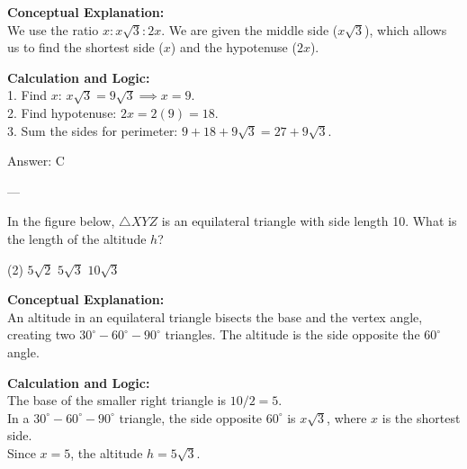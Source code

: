 \documentclass[11pt,paper=a4,answers]{exam}
\begin{document}
\begin{questions}
\begin{solution}
\textbf{Conceptual Explanation:} \\
We use the ratio $x : x\sqrt{3} : 2x$. We are given the middle side ($x\sqrt{3}$), which allows us to find the shortest side ($x$) and the hypotenuse ($2x$).

\vspace{10pt}
\textbf{Calculation and Logic:} \\
1. Find $x$: $x\sqrt{3} = 9\sqrt{3} \implies x = 9$. \\
2. Find hypotenuse: $2x = 2(9) = 18$. \\
3. Sum the sides for perimeter: $9 + 18 + 9\sqrt{3} = 27 + 9\sqrt{3}$.

\vspace{15pt}
Answer: \colorbox{yellow!100}{C}
\end{solution}

---

\question
In the figure below, $\triangle XYZ$ is an equilateral triangle with side length 10. What is the length of the altitude $h$?
\begin{center}
\end{center}
\begin{tasks}(2)
    \task $5\sqrt{2}$
    \task $5\sqrt{3}$
    \task $10\sqrt{3}$
\end{tasks}

\begin{solution}
\textbf{Conceptual Explanation:} \\
An altitude in an equilateral triangle bisects the base and the vertex angle, creating two $30^\circ-60^\circ-90^\circ$ triangles. The altitude is the side opposite the $60^\circ$ angle.

\vspace{10pt}
\textbf{Calculation and Logic:} \\
The base of the smaller right triangle is $10/2 = 5$. \\
In a $30^\circ-60^\circ-90^\circ$ triangle, the side opposite $60^\circ$ is $x\sqrt{3}$, where $x$ is the shortest side. \\
Since $x = 5$, the altitude $h = 5\sqrt{3}$.


\end{solution}
\end{questions}
\end{document}

